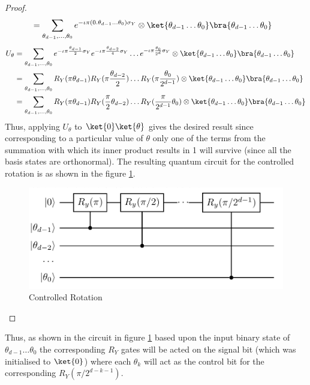 \documentclass[12pt, oneside]{book}
\theoremstyle{definition}
\theoremstyle{definition}
\theoremstyle{remark}
\begin{document}
\begin{enumerate}
\begin{proof}
\begin{align*}
        &=\sum_{\theta_{d-1},\dots,\theta_0}e^{-\iota \pi(0.\theta_{d-1}\ldots \theta_0)\sigma_Y} \otimes \ket{\theta_{d-1}\ldots\theta_0}\bra{\theta_{d-1}\ldots\theta_0}
        \end{align*}
        \begin{align*}
        U_{\theta}&=\sum_{\theta_{d-1},\ldots,\theta_0} e^{-\iota \pi\frac{\theta_{d-1}}{2}\sigma_Y}e^{-\iota \pi\frac{\theta_{d-2}}{4}\sigma_Y}\ldots e^{-\iota\pi \frac{\theta_0}{2^{d}}\sigma_Y} \otimes \ket{\theta_{d-1}\ldots\theta_0}\bra{\theta_{d-1}\ldots\theta_0}\\
        &=\sum_{\theta_{d-1},\ldots,\theta_0} R_Y(\pi\theta_{d-1}) R_Y(\pi\frac{\theta_{d-2}}{2}) \ldots R_Y(\pi\frac{\theta_0}{2^{d-1}}) \otimes \ket{\theta_{d-1}\ldots\theta_0}\bra{\theta_{d-1}\ldots\theta_0}\\
        &=\sum_{\theta_{d-1},\ldots,\theta_0} R_Y(\pi\theta_{d-1})R_Y(\frac{\pi}{2}\theta_{d-2})\ldots R_Y(\frac{\pi}{2^{d-1}}\theta_0) \otimes \ket{\theta_{d-1}\ldots\theta_0}\bra{\theta_{d-1}\ldots\theta_0}
        \end{align*}
        Thus, applying $U_{\theta}$ to $\ket{0}\ket{\theta}$ gives the desired result since corresponding to a particular value of $\theta$ only one of the terms from the summation with which its inner product results in 1 will survive (since all the basis states are orthonormal).
        The resulting quantum circuit for the controlled rotation is as shown in the figure \ref{fig:controlledrotation}.
        \begin{figure}
            \centering
            \includegraphics[width=\linewidth]{../images/Controlledrotation.png}
            \caption{Controlled Rotation}
            \label{fig:controlledrotation}
        \end{figure}
    \end{proof}
    Thus, as shown in the circuit in figure \ref{fig:controlledrotation} based upon the input binary state of $\theta_{d-1}\ldots\theta_0$ the corresponding $R_Y$ gates will be acted on the signal bit (which was initialised to $\ket{0}$) where each $\theta_k$ will act as the control bit for the corresponding $R_Y(\pi/2^{d-k-1})$.


\end{enumerate}
\end{document}
